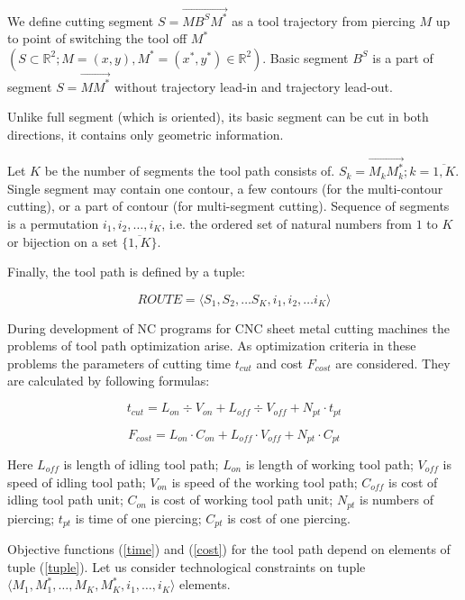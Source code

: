\documentclass{../download/tPRS2e}
\begin{document}
We define cutting segment  $S = \overrightarrow{M B^S M^*}$
as a tool trajectory from piercing  $M$ up to point of switching the tool off  $M^*$
$(S \subset \mathbb{R}^2; M = (x, y), M^ *= (x^*, y^*) \in \mathbb{R}^2)$.
Basic segment $B^S$ is a part of segment $S = \overrightarrow{M M^*}$
without trajectory lead-in and trajectory lead-out.

Unlike full segment (which is oriented),
its basic segment can be cut in both directions,
it contains only geometric information.

Let $K$ be the number of segments the tool path consists of.
$S_k = \overrightarrow{M_k M_k^*}; k = \overline{1, K}$.
Single segment may contain one contour,
a few contours (for the multi-contour cutting),
or a part of contour (for multi-segment cutting).
Sequence of segments is a permutation $i_1, i_2, \dots, i_K$,
i.e. the ordered set of natural numbers from $1$ to $K$
or bijection on a set $\{\overline{1, K}\}$.

Finally, the tool path is defined by a tuple:

\begin{equation} \label{tuple}
ROUTE = \langle S_1, S_2, \dots S_K, i_1, i_2, \dots i_K \rangle 
\end{equation}

During development of NC programs for CNC sheet metal cutting machines the problems of tool path optimization arise.
As optimization criteria in these problems the parameters of cutting time $t_{cut}$ and cost $F_{cost}$ are considered.
They are calculated by following formulas:

\begin{equation} \label{time}
t_{cut} = L_{on} \div V_{on} + L_{off} \div V_{off} + N_{pt} \cdot t_{pt}
\end{equation}

\begin{equation} \label {cost}
F_{cost} = L_{on} \cdot C_{on} + L_{off} \cdot V_{off} + N_{pt} \cdot C_{pt}
\end{equation}

Here $L_{off}$ is length of idling tool path;
$L_{on}$ is length of working tool path;
$V_{off}$ is speed of idling tool path;
$V_{on}$ is speed of the working tool path;
$C_{off}$ is cost of idling tool path unit;
$C_{on}$ is cost of working tool path unit;
$N_{pt}$ is numbers of piercing;
$t_{pt}$ is time of one piercing;
$C_{pt}$ is cost of one piercing.

Objective functions (\ref{time}) and (\ref{cost})
for the tool path depend on elements of tuple (\ref{tuple}).
Let us consider technological constraints on tuple
$\langle M_1, M_1^*, \dots , M_K, M_K^*, i_1, \dots , i_K \rangle$
elements.
\end{document}
